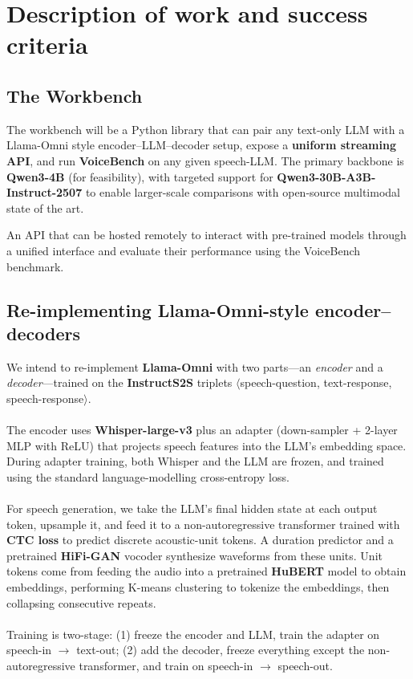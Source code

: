 \documentclass[11pt,a4paper]{scrartcl}
\begin{document}
\section{Description of work and success criteria}

\subsection{The Workbench}

The workbench will be a Python library that can pair any text-only LLM with a Llama-Omni style encoder–LLM–decoder setup, expose a \textbf{uniform streaming API}, and run \textbf{VoiceBench} on any given speech-LLM. The primary backbone is \textbf{Qwen3-4B} (for feasibility), with targeted support for \textbf{Qwen3-30B-A3B-Instruct-2507} to enable larger-scale comparisons with open-source multimodal state of the art.

\begin{successbox}
An API that can be hosted remotely to interact with pre-trained models through a unified interface and evaluate their performance using the VoiceBench benchmark.
\end{successbox}

\subsection{Re-implementing \textbf{Llama-Omni}-style encoder–decoders}
We intend to re-implement \textbf{Llama-Omni} with two parts—an \textit{encoder} and a \textit{decoder}—trained on the \textbf{InstructS2S} triplets \(\langle\)speech-question, text-response, speech-response\(\rangle\).
\\
\\
The encoder uses \textbf{Whisper-large-v3} plus an adapter (down-sampler + 2-layer MLP with ReLU) that projects speech features into the LLM’s embedding space. During adapter training, both Whisper and the LLM are frozen, and trained using the standard language-modelling cross-entropy loss.
\\
\\
For speech generation, we take the LLM’s final hidden state at each output token, upsample it, and feed it to a non-autoregressive transformer trained with \textbf{CTC loss} to predict discrete acoustic-unit tokens. A duration predictor and a pretrained \textbf{HiFi-GAN} vocoder synthesize waveforms from these units. Unit tokens come from feeding the audio into a pretrained \textbf{HuBERT} model to obtain embeddings, performing K-means clustering to tokenize the embeddings, then collapsing consecutive repeats.
\\
\\
Training is two-stage: (1) freeze the encoder and LLM, train the adapter on speech-in \(\rightarrow\) text-out; (2) add the decoder, freeze everything except the non-autoregressive transformer, and train on speech-in \(\rightarrow\) speech-out.
\end{document}
